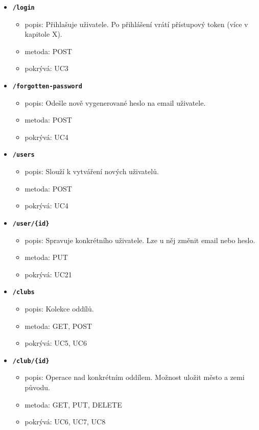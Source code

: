 \begin{itemize}
  \item \texttt{\textbf{/login}}
  \begin{itemize}
    \item popis: Přihlašuje uživatele. Po přihlášení vrátí přístupový token (více v kapitole X).
    \item metoda: POST
    \item pokrývá: UC3
  \end{itemize}
  \item \texttt{\textbf{/forgotten-password}}
  \begin{itemize}
    \item popis: Odešle nově vygenerované heslo na email uživatele.
    \item metoda: POST
    \item pokrývá: UC4
  \end{itemize}
  \item \texttt{\textbf{/users}}
  \begin{itemize}
    \item popis: Slouží k vytváření nových uživatelů.
    \item metoda: POST
    \item pokrývá: UC4
  \end{itemize}
  \item \texttt{\textbf{/user/\{id\}}}
  \begin{itemize}
    \item popis: Spravuje konkrétního uživatele. Lze u něj změnit email nebo heslo.
    \item metoda: PUT
    \item pokrývá: UC21
  \end{itemize}
  \item \texttt{\textbf{/clubs}}
  \begin{itemize}
    \item popis: Kolekce oddílů.
    \item metoda: GET, POST
    \item pokrývá: UC5, UC6
  \end{itemize}
  \item \texttt{\textbf{/club/\{id\}}}
  \begin{itemize}
    \item popis: Operace nad konkrétním oddílem. Možnost uložit město a zemi původu.
    \item metoda: GET, PUT, DELETE
    \item pokrývá: UC6, UC7, UC8
  \end{itemize}

\end{itemize}

